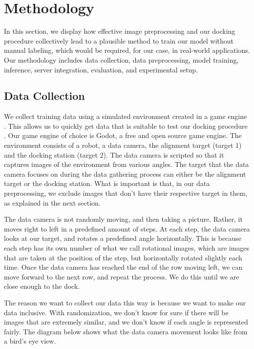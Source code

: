 \section{Methodology}
In this section, we display how effective image preprocessing and our docking procedure collectively lead to a plausible method to train our model without manual labeling, which would be required, for our case, in real-world applications. Our methodology includes data collection, data preprocessing, model training, inference, server integration, evaluation, and experimental setup.

\subsection{Data Collection}
We collect training data using a simulated environment created in a game engine \citep{hoster2024usinggameenginesmachine}. This allows us to quickly get data that is suitable to test our docking procedure \citep{depth_anything_v2}. Our game engine of choice is Godot, a free and open source game engine. The environment consists of a robot, a data camera, the alignment target (target 1) and the docking station (target 2). The data camera is scripted so that it captures images of the environment from various angles. The target that the data camera focuses on during the data gathering process can either be the alignment target or the docking station. What is important is that, in our data preprocessing, we exclude images that don't have their respective target in them, as explained in the next section.

The data camera is not randomly moving, and then taking a picture. Rather, it moves right to left in a predefined amount of steps. At each step, the data camera looks at our target, and rotates a predefined angle horizontally. This is because each step has its own number of what we call rotational images, which are images that are taken at the position of the step, but horizontally rotated slightly each time. Once the data camera has reached the end of the row moving left, we can move forward to the next row, and repeat the process. We do this until we are close enough to the dock.


The reason we want to collect our data this way is because we want to make our data inclusive. With randomization, we don't know for sure if there will be images that are extremely similar, and we don't know if each angle is represented fairly. The diagram below shows what the data camera movement looks like from a bird's eye view.


